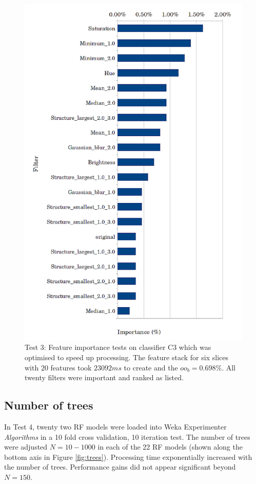 \begin{figure}[!htbp]\myfloatalign
\includegraphics[width=1\linewidth]{gfx6/features/c3-importances} \caption[Feature importances classifier test 3.]{Test 3: Feature importance tests on classifier C3 which was optimised to speed up processing. The feature stack for six slices with $ 20 $ features took $ 23092ms $ to create and the $ oo_b=0.698\%$. All twenty filters were important and ranked as listed.}\label{fig:c3}
\end{figure}

\subsection{Number of trees}\label{sec:number-of-trees}
In Test 4, twenty two \ac{RF} models were loaded into Weka Experimenter \emph{Algorithms} in a 10 fold cross validation, 10 iteration test. The number of trees were adjusted $ N = 10 - 1000 $ in each of the 22 \ac{RF} models (shown along the bottom axis in Figure \ref{fig:trees}). Processing time exponentially increased with the number of trees. Performance gains did not appear significant beyond $N = 150$.

